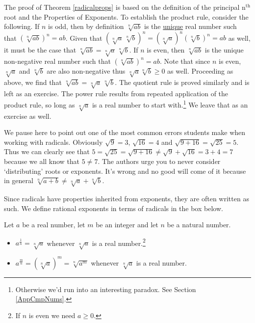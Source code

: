 \documentclass{ximera}
\begin{document}

\medskip

The proof of Theorem \ref{radicalprops} is based on the definition of the principal $\text{n}^{\text{th}}$ root and the Properties of Exponents.  To establish the product rule, consider the following.  If $n$ is odd, then by definition $\sqrt[n]{ab}$ is the \underline{unique} real number such that $(\sqrt[n]{ab})^{n} = ab$.  Given that $( \sqrt[n]{a} \, \sqrt[n]{b})^n = (\sqrt[n]{a})^n (\sqrt[n]{b})^n = ab$ as well, it must be the case that $\sqrt[n]{ab} = \sqrt[n]{a} \, \sqrt[n]{b}$. If $n$ is even, then $\sqrt[n]{ab}$ is the unique non-negative real number such that $(\sqrt[n]{ab})^{n} = ab$.  Note that since $n$ is even, $\sqrt[n]{a}$ and $\sqrt[n]{b}$ are also non-negative thus $\sqrt[n]{a}\sqrt[n]{b} \geq 0$ as well.  Proceeding as above, we find that $\sqrt[n]{ab} = \sqrt[n]{a} \, \sqrt[n]{b}$.  The quotient rule is proved similarly and is left as an exercise.  The power rule results from repeated application of the product rule, so long as $\sqrt[n]{a}$ is a real number to start with.\footnote{Otherwise we'd run into an interesting paradox.  See Section \ref{AppCmpNums}.}   We leave that as an exercise as well.

\smallskip

We pause here to point out one of the most common errors students make when working with radicals.  Obviously $\sqrt{9} = 3$, $\sqrt{16} = 4$ and $\sqrt{9 + 16} = \sqrt{25} = 5$.  Thus we can clearly see that $5 = \sqrt{25} = \sqrt{9 + 16} \neq \sqrt{9} + \sqrt{16} = 3 + 4 = 7$ because we all know that $5 \neq 7$.  The authors urge you to never consider `distributing' roots or exponents.  It's wrong and no good will come of it because in general $\sqrt[n]{a+b} \neq \sqrt[n]{a} + \sqrt[n]{b}$. 

\label{donotdistributeexponents}

\smallskip

Since radicals have properties inherited from exponents, they are often written as such.  We define rational exponents in terms of radicals in the box below.

\medskip


\begin{definition}  \label{rationalexponentdefn} Let $a$ be a real number, let $m$ be an integer and let $n$ be a natural number. 

\begin{itemize}

\item  $a^{\frac{1}{n}} = \sqrt[n]{a}$ whenever $\sqrt[n]{a}$ is a real number.\footnote{If $n$ is even we need $a \geq 0$.}

\item  $a^{\frac{m}{n}}  = \left(\sqrt[n]{a}\right)^m = \sqrt[n]{a^m}$ whenever $\sqrt[n]{a}$ is a real number.

\end{itemize}
\end{definition}
\end{document}
